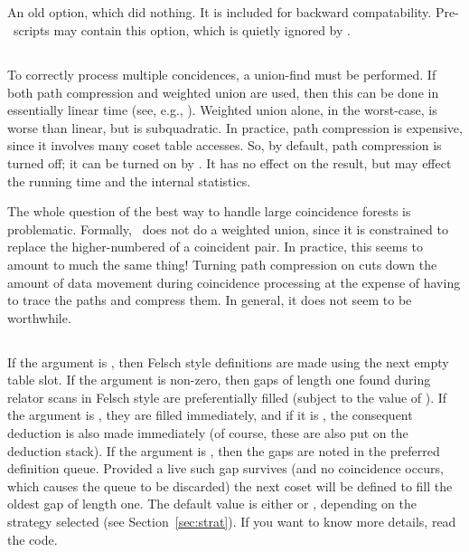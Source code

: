 \subsection{}

An old option, which did nothing.
It is included for backward compatability.
Pre-\acet\ scripts may contain this option, which is quietly ignored
  by \acet.

\subsection{}

To correctly process multiple concidences, a union-find must be performed.
If both path compression and weighted union are used, then this can be
  done in essentially linear time (see, e.g., \cite{CLR}).
Weighted union alone, in the worst-case, is worse than linear, but is
  subquadratic.
In practice, path compression is expensive, since it involves many coset
  table accesses.
So, by default, path compression is turned off; it can be turned on by
  .
It has no effect on the result, but may effect the running time and the
  internal statistics.

The whole question of the best way to handle large coincidence forests is
  problematic.
Formally, \ace\ does not do a weighted union, since it is constrained to
  replace the higher-numbered of a coincident pair.
In practice, this seems to amount to much the same thing!
Turning path compression on cuts down the amount of data movement during
  coincidence processing at the expense of having to trace the paths and
  compress them.
In general, it does not seem to be worthwhile.

\subsection{}

If the argument is , then Felsch style definitions are made using
  the next empty table slot.
If the argument is non-zero, then gaps of length one found during relator
  scans in Felsch style are preferentially filled (subject to the value
  of ).
If the argument is , they are filled immediately, and if it is
  , the consequent deduction is also made immediately (of course,
  these are also put on the deduction stack).  
If the argument is , then the gaps are noted in the preferred
  definition queue.  
Provided a live such gap survives (and no coincidence occurs, which causes
  the queue to be discarded) the next coset will be defined to fill the
  oldest gap of length one.
The default value is either  or , depending on the strategy
  selected (see Section~\ref{sec:strat}).
If you want to know more details, read the code.

